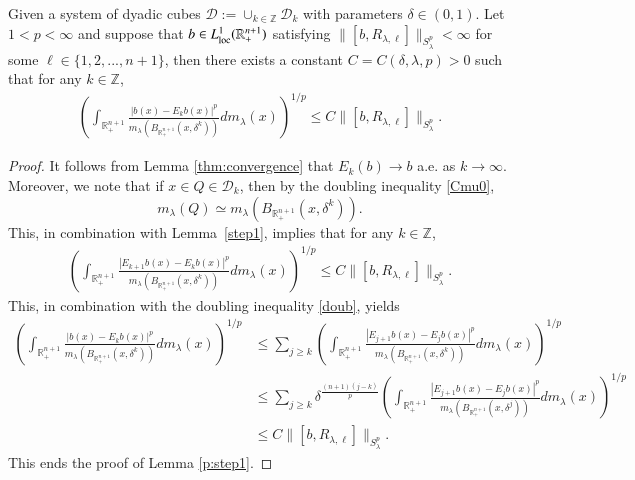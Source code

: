\documentclass[12pt]{amsart}
\begin{document}
\begin{coro}\label{p:step1}
Given a
system of dyadic cubes $\mathcal{D}
    := \cup_{k\in\mathbb{Z}}\mathcal{D}_{k}$ with parameters $\delta\in(0,1)$.  Let $1<p<\infty$ and suppose that $b\in L_{{\rm loc}}^1(\mathbb{R}_{+}^{n+1})$  satisfying $\|[b,R_{\lambda,\ell}]\|_{S_\lambda^p}<\infty$ for some $\ell\in\{1,2,...,n+1\}$, then there exists a constant $C=C(\delta,\lambda,p)>0$ such that for any $k\in\mathbb{Z}$,
\begin{align} \label{e:step11}
\left(\int_{\mathbb{R}_{+}^{n+1}}\frac{|b(x)-E_{k}b(x)|^{p}}{m_\lambda(B_{\mathbb{R}_+^{n+1}}(x,\delta^{k}))}dm_\lambda(x)\right)^{1/p}\leq C\|[b,R_{\lambda,\ell}]\|_{S_\lambda^p}.
\end{align}
\end{coro}

\begin{proof}
It follows from Lemma \ref{thm:convergence} that $E_{k}(b)\rightarrow b$ a.e. as $k\rightarrow \infty$. Moreover, we note that if $x\in Q\in\mathcal{D}_{k}$, then by the doubling inequality \eqref{Cmu0},
$$m_\lambda(Q)\simeq m_\lambda(B_{\mathbb{R}_+^{n+1}}(x,\delta^{k})).$$ This, in combination with Lemma~\ref{step1}, implies that for any $k\in\mathbb{Z}$,
\begin{align*}
\left(\int_{\mathbb{R}_{+}^{n+1}}\frac{|E_{k+1}b(x)-E_{k}b(x)|^{p}}{m_\lambda(B_{\mathbb{R}_+^{n+1}}(x,\delta^{k}))}dm_\lambda(x)\right)^{1/p}\leq C\|[b,R_{\lambda,\ell}]\|_{S_\lambda^p}.
\end{align*}
This, in combination with the doubling inequality \eqref{doub}, yields
\begin{align*}
\left(\int_{\mathbb{R}_{+}^{n+1}}\frac{|b(x)-E_{k}b(x)|^{p}}{m_\lambda(B_{\mathbb{R}_+^{n+1}}(x,\delta^{k}))}dm_\lambda(x)\right)^{1/p}
&\leq \sum_{j\geq k}\left(\int_{\mathbb{R}_{+}^{n+1}}\frac{|E_{j+1}b(x)-E_{j}b(x)|^{p}}{m_\lambda(B_{\mathbb{R}_+^{n+1}}(x,\delta^{k}))}dm_\lambda(x)\right)^{1/p}\\
&\leq \sum_{j\geq k}{\delta^{\frac{(n+1)(j-k)}{p}}}\left(\int_{\mathbb{R}_{+}^{n+1}}\frac{|E_{j+1}b(x)-E_{j}b(x)|^{p}}{m_\lambda(B_{\mathbb{R}_+^{n+1}}(x,\delta^{j}))}dm_\lambda(x)\right)^{1/p}\\
&\leq C\|[b,R_{\lambda,\ell}]\|_{S_\lambda^p}.
\end{align*}
This ends the proof of Lemma \ref{p:step1}.
\end{proof}
\end{document}
